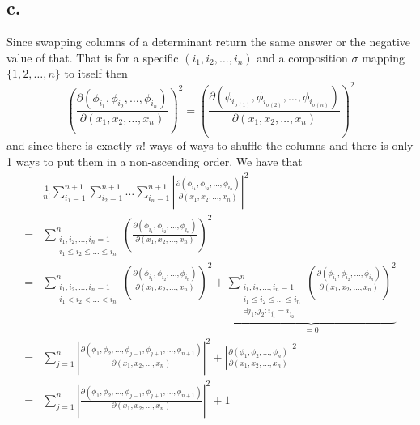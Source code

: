 \documentclass[11pt]{article}
\begin{document}
\subsection*{c.}
Since swapping columns of a determinant return the same answer or the negative value of that. 
That is for a specific $(i_1, i_2, \ldots, i_n)$ and 
a composition $\sigma$ mapping $\{1, 2, \ldots, n\}$ to itself then
\[
    \left( \frac{\partial (\phi_{i_1}, \phi_{i_2}, \ldots, \phi_{i_n})}{\partial (x_1, x_2, \ldots, x_n)}\right)^2
    = \left( \frac{\partial (\phi_{i_{\sigma(1)}}, \phi_{i_{\sigma(2)}}, \ldots, \phi_{i_{\sigma(n)}})}{\partial (x_1, x_2, \ldots, x_n)}\right)^2
\]
and since there is exactly $n$! ways of ways to shuffle the columns and there is only 1 ways to put them in a 
non-ascending order. We have that 
\begin{equation*}
    \begin{aligned}
        &\frac{1}{n!} \sum_{i_1 = 1}^{n+1} \sum_{i_2 = 1}^{n+1} \ldots \sum_{i_n = 1}^{n+1}  \left| \frac{\partial (\phi_{i_1}, \phi_{i_2}, \ldots, \phi_{i_n})}{\partial (x_1, x_2, \ldots, x_n)}\right|^2 \\
        =& \sum_{\substack{i_1, i_2, \ldots, i_n = 1 \\ i_1 \le i_2 \le \ldots \le i_n}}^n \left( \frac{\partial (\phi_{i_1}, \phi_{i_2}, \ldots, \phi_{i_n})}{\partial (x_1, x_2, \ldots, x_n)}\right)^2 \\
        =& \sum_{\substack{i_1, i_2, \ldots, i_n = 1 \\ i_1 < i_2 < \ldots < i_n}}^n \left( \frac{\partial (\phi_{i_1}, \phi_{i_2}, \ldots, \phi_{i_n})}{\partial (x_1, x_2, \ldots, x_n)}\right)^2 + \underbrace{\sum_{\substack{i_1, i_2, \ldots, i_n = 1 \\ i_1 \le i_2 \le \ldots \le i_n \\ \exists j_1, j_2 : i_{j_1} = i_{j_2}}}^n \left( \frac{\partial (\phi_{i_1}, \phi_{i_2}, \ldots, \phi_{i_n})}{\partial (x_1, x_2, \ldots, x_n)}\right)^2 }_{=0} \\  
        =& \sum_{j=1}^n  \left| \frac{\partial (\phi_1, \phi_2, \ldots, \phi_{j-1}, \phi_{j+1}, \ldots, \phi_{n+1})}{\partial (x_1, x_2, \ldots, x_n)}\right|^2 +  \left| \frac{\partial (\phi_1, \phi_2, \ldots, \phi_n)}{\partial (x_1, x_2, \ldots, x_n)}\right|^2 \\
        =& \sum_{j=1}^n  \left| \frac{\partial (\phi_1, \phi_2, \ldots, \phi_{j-1}, \phi_{j+1}, \ldots, \phi_{n+1})}{\partial (x_1, x_2, \ldots, x_n)}\right|^2 + 1
    \end{aligned}
\end{equation*}
\end{document}
